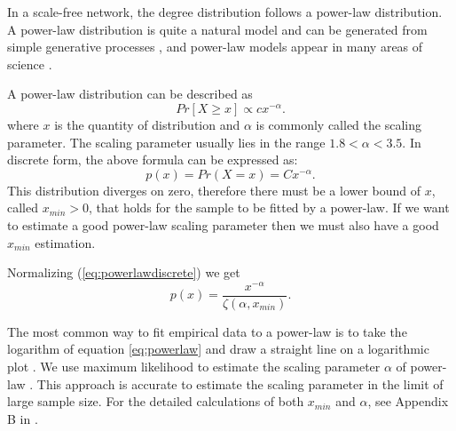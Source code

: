 \documentclass[paper]{ieice}
\begin{document}
In a scale-free network, the degree distribution follows a power-law distribution.   
A power-law distribution is quite a natural model and can be generated from simple generative processes \cite{mitzenmacher2004brief}, and power-law models appear in many areas of science \cite{clauset2009power} \cite{mitzenmacher2004brief}. 

A power-law distribution can be described as
\begin{equation}
Pr[X\ge x] \propto cx^{-\alpha}.
\label{eq:powerlaw}
\end{equation}
where $x$ is the quantity of distribution and $\alpha$ is commonly called the scaling parameter. 
The scaling parameter usually lies in the range $1.8<\alpha<3.5$.
In discrete form, the above formula can be expressed as:
\begin{equation}
p(x) = Pr(X=x) = Cx^{- \alpha}.
\label{eq:powerlawdiscrete}
\end{equation}
This distribution diverges on zero, therefore there must be a lower bound of $x$, called $x_{min} > 0$, that holds for the sample to be fitted by a power-law. 
If we want to estimate a good power-law scaling parameter then we must also have a good $x_{min}$ estimation. 

Normalizing (\ref{eq:powerlawdiscrete})  we get
\begin{equation}
p(x)=\frac{x^{- \alpha}}{\zeta(\alpha,x_{min})}.
\end{equation} 

The most common way to fit empirical data to a power-law is to take the logarithm of equation \ref{eq:powerlaw} and draw a straight line on a logarithmic plot \cite{mitzenmacher2004brief}.  
We use maximum likelihood to estimate the scaling parameter $\alpha$ of power-law \cite{clauset2009power}.  
This approach is accurate to estimate the scaling parameter in the limit of large sample size. 
For the detailed calculations of both $x_{min}$ and $\alpha$, see Appendix B in \cite{clauset2009power}.
\end{document}

